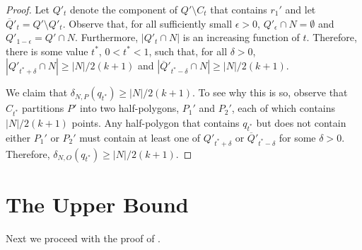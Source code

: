 \documentclass{birkjour}
\begin{document}
\begin{proof}
Let $Q'_t$ denote the component of $Q'\setminus C_t$ that contains
$r_1'$ and let $\overline{Q}'_t = Q'\setminus Q'_t$.
Observe that, for all sufficiently small $\epsilon > 0$, $Q'_\epsilon\cap
N=\emptyset$ and $Q'_{1-\epsilon} = Q'\cap N$.  Furthermore, $|Q'_t\cap N|$
is an increasing function of $t$.
Therefore, there is some value $t^*$, $0 < t^* < 1$, such that, for
all $\delta > 0$, 
$|Q'_{t^*+\delta}\cap N|\ge |N|/2(k+1)$ and 
$|\overline{Q}'_{t^*-\delta}\cap N|\ge |N|/2(k+1)$.

We claim that $\delta_{N,P}(q_{t^*}) \ge |N|/2(k+1)$.   To see
why this is so, observe that $C_{t^*}$ partitions $P'$ into two
half-polygons, $P_1'$ and $P_2'$, each of which contains $|N|/2(k+1)$
points.  Any half-polygon that contains $q_{t^*}$ but does not contain
either $P_1'$ or $P_2'$ must contain at least one of 
$Q'_{t^*+\delta}$ or 
$\overline{Q}'_{t^*-\delta}$ for some $\delta > 0$.
Therefore, $\delta_{N,O}(q_{t^*}) \ge |N|/2(k+1)$.
\end{proof}

\section{The Upper Bound}

Next we proceed with the proof of .
\end{document}
